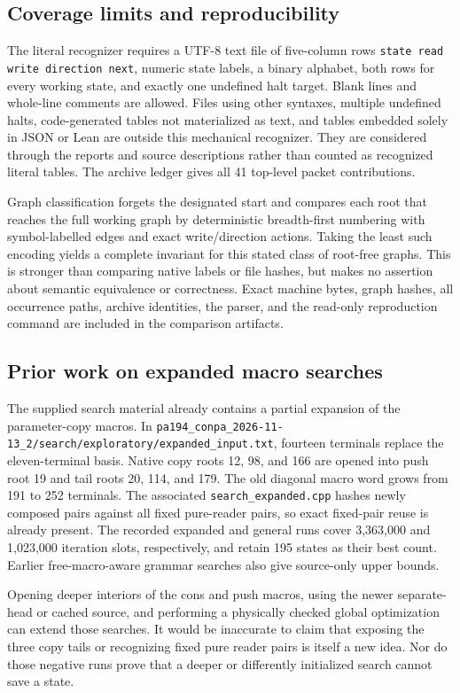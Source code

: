 \subsection{Coverage limits and reproducibility}

The literal recognizer requires a UTF-8 text file of five-column rows
\texttt{state read write direction next}, numeric state labels, a binary
alphabet, both rows for every working state, and exactly one undefined
halt target. Blank lines and whole-line comments are allowed. Files using
other syntaxes, multiple undefined halts, code-generated tables not
materialized as text, and tables embedded solely in JSON or Lean are
outside this mechanical recognizer. They are considered through the
reports and source descriptions rather than counted as recognized literal
tables. The archive ledger gives all 41 top-level packet contributions.

Graph classification forgets the designated start and compares each
root that reaches the full working graph by deterministic breadth-first
numbering with symbol-labelled edges and exact write/direction actions.
Taking the least such encoding yields a complete invariant for this
stated class of root-free graphs. This is stronger than comparing native
labels or file hashes, but makes no assertion about semantic equivalence
or correctness. Exact machine bytes, graph hashes, all occurrence paths,
archive identities, the parser, and the read-only reproduction command
are included in the comparison artifacts.

\subsection{Prior work on expanded macro searches}

The supplied search material already contains a partial expansion of
the parameter-copy macros. In
\nolinkurl{pa194_conpa_2026-11-13_2/search/exploratory/expanded_input.txt},
fourteen terminals replace the eleven-terminal basis. Native copy roots
12, 98, and 166 are opened into push root 19 and tail roots 20, 114,
and 179. The old diagonal macro word grows from 191 to 252 terminals.
The associated \nolinkurl{search_expanded.cpp} hashes newly composed
pairs against all fixed pure-reader pairs, so exact fixed-pair reuse
is already present. The recorded expanded and general runs cover
3,363,000 and 1,023,000 iteration slots, respectively, and retain 195
states as their best count. Earlier free-macro-aware grammar searches
also give source-only upper bounds.

Opening deeper interiors of the cons and push macros, using the newer
separate-head or cached source, and performing a physically checked
global optimization can extend those searches. It would be inaccurate
to claim that exposing the three copy tails or recognizing fixed pure
reader pairs is itself a new idea. Nor do those negative runs prove
that a deeper or differently initialized search cannot save a state.
